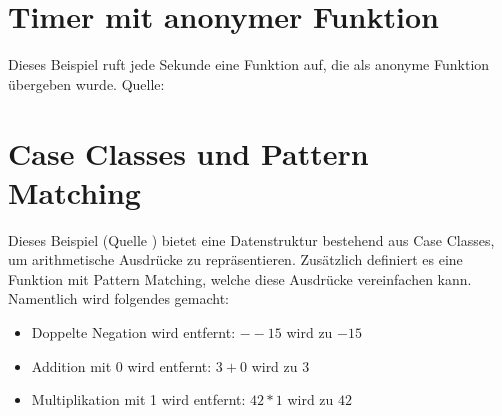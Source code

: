 \section{Timer mit anonymer Funktion}
\label{sec:bspAnonymous}

Dieses Beispiel ruft jede Sekunde eine Funktion auf, die als
anonyme Funktion übergeben wurde.
Quelle: \cite{scalaTutorial}



\section{Case Classes und Pattern Matching}
\label{sec:caseClasses}

Dieses Beispiel (Quelle \cite{odersky}) bietet eine Datenstruktur
bestehend aus Case Classes, um arithmetische Ausdrücke zu
repräsentieren. Zusätzlich definiert es eine Funktion mit Pattern
Matching, welche diese Ausdrücke vereinfachen kann.  Namentlich wird
folgendes gemacht:

\begin{itemize}
\item Doppelte Negation wird entfernt: $--15$ wird zu $-15$
\item Addition mit 0 wird entfernt: $3 + 0$ wird zu $3$
\item Multiplikation mit 1 wird entfernt: $42 * 1$ wird zu $42$
\end{itemize}


